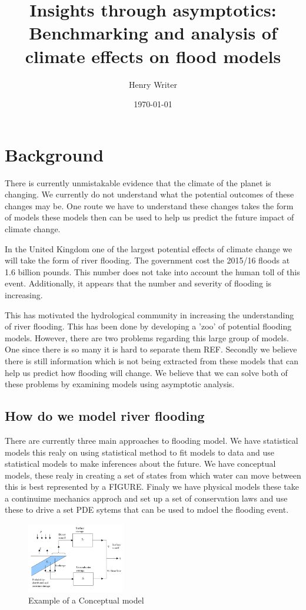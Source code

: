 \documentclass[11pt]{article}
\title{\Huge\textbf{Insights through asymptotics:}\\
 \LARGE Benchmarking and analysis of climate effects on flood models}
\author{Henry Writer }
\date{\today}
\begin{document}
\maketitle

\section{Background}

There is currently unmistakable evidence that the climate of the planet is changing. We currently do not understand what the potential outcomes of these changes may be. One route we have to understand these changes takes the form of models these models then can be used to help us predict the future impact of climate change.

In the United Kingdom one of the largest potential effects of climate change we will take the form of river flooding. The government cost the 2015/16 floods at 1.6 billion pounds. This number does not take into account the human toll of this event. Additionally, it appears that the number and severity of flooding is increasing. 


This has motivated the hydrological community in increasing the understanding of river flooding. This has been done by developing a 'zoo' of potential flooding models. However, there are two problems regarding this large group of models. One since there is so many it is hard to separate them REF. 
Secondly we believe there is still information which is not being extracted from these models that can help us predict how flooding will change. We believe that we can solve both of these problems by examining models using asymptotic analysis.

\subsection{How do we model river flooding}
There are currently three main approaches to flooding model. We have statistical models this realy on using statistical method to fit models to data and use statistical models to make inferences about the future. 
We have conceptual models, these realy in creating a set of states from which water can move between this is best represented by a FIGURE. 
Finaly we have physical models these take a continuime mechanics approch and set up a set of conservation laws and use these to drive a set PDE sytems that can be used to mdoel the flooding event.

\begin{figure}[H]
    \centering
    \includegraphics[width=0.38\textwidth]{Figs/Concept.png}
    \caption{Example of a Conceptual model}
    \label{fig:conceptual}
\end{figure}
\end{document}
